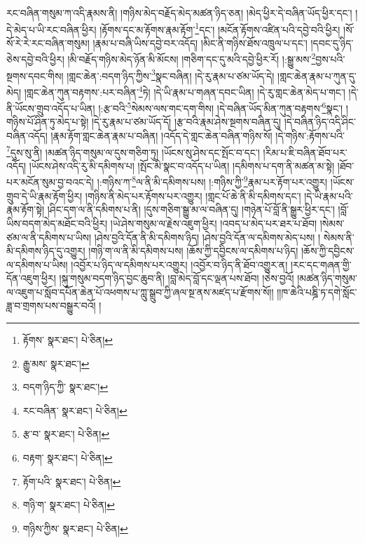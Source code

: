རང་བཞིན་གསུམ་ཀ་འདི་རྣམས་ནི། །གཉིས་མེད་བརྗོད་མེད་མཚན་ཉིད་ཅན། །མེད་ཕྱིར་དེ་བཞིན་ཡོད་ཕྱིར་དང་། །དེ་མེད་པ་ཡི་རང་བཞིན་ཕྱིར། །རྟོགས་དང་མ་རྟོགས་རྣམ་རྟོག་\footnote{རྟོགས་  སྣར་ཐང་།  པེ་ཅིན། }དང་། །མངོན་རྟོགས་འཛིན་པའི་དབྱེ་བའི་ཕྱིར། །སོ་སོ་རེ་རེ་རང་བཞིན་གསུམ། །རྣམ་པ་བཞི་ཡིས་དབྱེ་བར་འདོད། །མིང་ནི་གཉིས་ཐོས་འཁྲུལ་པ་དང་། །དབང་དུ་ཉིད་ཅེས་དབྱེ་བའི་ཕྱིར། །མི་བརྗོད་གཉིས་མེད་ཉོན་མི་མོངས། །གཅིག་དང་དུ་མའི་དབྱེ་ཕྱིར་རོ། །:སྒྱུ་མས་\footnote{རྒྱུ་མས་  སྣར་ཐང་། }བྱས་པའི་སྔགས་དབང་གིས། །གླང་ཆེན་:བདག་ཉིད་ཀྱིས་\footnote{བདག་ཉིད་ཀྱི་  སྣར་ཐང་། }སྣང་བཞིན། །དེ་རུ་རྣམ་པ་ཙམ་ཡོད་དེ། །གླང་ཆེན་རྣམ་པ་ཀུན་དུ་མེད། །གླང་ཆེན་ཀུན་བརྟགས་:པར་བཞིན་\footnote{རང་བཞིན་  སྣར་ཐང་།  པེ་ཅིན། }ཏེ། །དེ་ཡི་རྣམ་པ་གཞན་དབང་ཡིན། །དེ་རུ་གླང་ཆེན་མེད་པ་གང་། །དེ་ནི་ཡོངས་གྲུབ་འདོད་པ་ཡིན། །:རྩ་བའི་\footnote{རྩ་བ་  སྣར་ཐང་།  པེ་ཅིན། }སེམས་ལས་གང་དག་གིས། །དེ་བཞིན་ཡོད་མིན་ཀུན་བརྟགས་\footnote{བརྟག་  སྣར་ཐང་།  པེ་ཅིན། }སྣང་། །གཉིས་པོ་ཤིན་ཏུ་མེད་པ་སྟེ། །དེ་རུ་རྣམ་པ་ཙམ་ཡོད་དོ། །རྩ་བའི་རྣམ་ཤེས་སྔགས་བཞིན་དུ། །དེ་བཞིན་ཉིད་འདི་ཤིང་བཞིན་འདོད། །རྣམ་རྟོག་གླང་ཆེན་རྣམ་པ་བཞིན། །འདོད་དེ་གླང་ཆེན་བཞིན་གཉིས་སོ། །དེ་གཉིས་:རྟོགས་པའི་\footnote{རྟོག་པའི་  སྣར་ཐང་།  པེ་ཅིན། }དུས་སུ་ནི། །མཚན་ཉིད་གསུམ་ལ་དུས་གཅིག་ཏུ། །ཡོངས་སུ་ཤེས་དང་སྤོང་བ་དང་། །རིམ་པ་ཇི་བཞིན་ཐོབ་པར་འདོད། །ཡོངས་ཤེས་འདི་རུ་མི་དམིགས་པ། །སྤོང་མི་སྣང་བ་འདོད་པ་ཡིན། །དམིགས་པ་དག་ནི་མཚན་མ་སྟེ། །ཐོབ་པར་མངོན་སུམ་བྱ་བའང་དེ། །:གཉིས་ཀ་\footnote{གཉི་ག་  སྣར་ཐང་།  པེ་ཅིན། }ལ་ནི་མི་དམིགས་པས། །:གཉིས་ཀྱི་\footnote{གཉིས་ཀྱིས་  སྣར་ཐང་།  པེ་ཅིན། }རྣམ་པར་རྟོག་པར་འགྱུར། །ཡོངས་གྲུབ་དེ་ཡི་རྣམ་རྟོག་ཕྱིར། །གཉིས་ནི་མེད་པར་རྟོགས་པར་འགྱུར། །གླང་པོ་ཆེ་ནི་མི་དམིགས་དང་། །དེ་ཡི་རྣམ་པའི་རྣམ་རྟོག་སྟེ། །ཤིང་དག་ལ་ནི་དམིགས་པ་ནི། །དུས་གཅིག་སྒྱུ་མ་ལ་བཞིན་དུ། །གཉེན་པོ་བློ་ནི་སྒྱུར་ཕྱིར་དང་། །བློ་ཡིས་བདག་མེད་མཐོང་བའི་ཕྱིར། །ཡེ་ཤེས་གསུམ་ལ་རྗེས་འཇུག་ཕྱིར། །འབད་པ་མེད་པར་ཐར་པ་ཐོབ། །སེམས་ཙམ་ལ་ནི་དམིགས་པ་ཡིས། །ཤེས་བྱའི་དོན་ནི་མི་དམིགས་ཉིད། །ཤེས་བྱའི་དོན་ལ་དམིགས་མེད་པས། །
སེམས་ནི་མི་དམིགས་ཉིད་དུ་འགྱུར། །གཉི་ག་ལ་ནི་མི་དམིགས་པས། །ཆོས་ཀྱི་དབྱིངས་ལ་དམིགས་པ་ཉིད། །ཆོས་ཀྱི་དབྱིངས་ལ་དམིགས་པ་ཡིས། །འབྱོར་པ་ཉིད་ལ་དམིགས་པར་འགྱུར། །འབྱོར་བ་ཉིད་ནི་ཐོབ་འགྱུར་ན། །རང་དང་གཞན་གྱི་དོན་འཇུག་ཕྱིར། །སྐུ་གསུམ་བདག་ཉིད་བྱང་ཆུབ་ནི། །བླ་མེད་བློ་དང་ལྡན་པས་ཐོབ། །ཅེས་བྱའོ། །མཚན་ཉིད་གསུམ་ལ་འཇུག་པ་སློབ་དཔོན་ཆེན་པོ་འཕགས་པ་ཀླུ་སྒྲུབ་ཀྱི་ཞལ་སྔ་ནས་མཛད་པ་རྫོགས་སོ།། །།ཁ་ཆེའི་པཎྜི་ཏ་དགེ་སློང་ཟླ་བ་གྲགས་པས་བསྒྱུར་བའོ། ། 